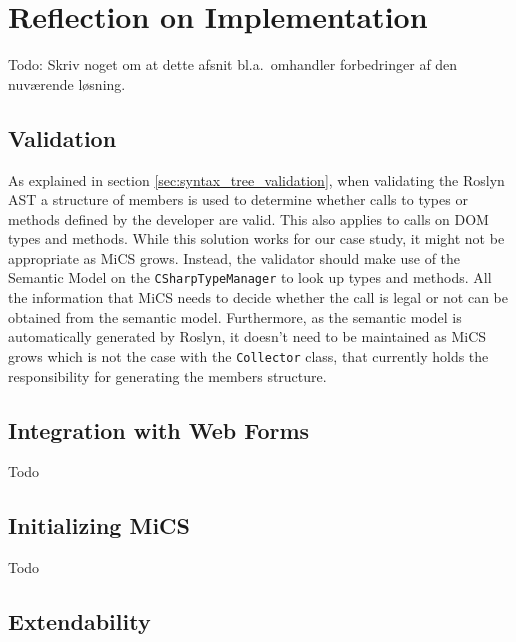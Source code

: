 \section{Reflection on Implementation} %
\label{sec:reflection_on_implementation}
Todo: Skriv noget om at dette afsnit bl.a.\ omhandler forbedringer af den nuværende løsning.

\subsection{Validation} %
\label{ssub:validation}

As explained in section \ref{sec:syntax_tree_validation}, when validating the Roslyn AST a structure of members is used to determine whether calls to types or methods defined by the developer are valid. This also applies to calls on DOM types and methods. While this solution works for our case study, it might not be appropriate as MiCS grows. Instead, the validator should make use of the Semantic Model on the \texttt{CSharpTypeManager} to look up types and methods. All the information that MiCS needs to decide whether the call is legal or not can be obtained from the semantic model. Furthermore, as the semantic model is automatically generated by Roslyn, it doesn't need to be maintained as MiCS grows which is not the case with the \texttt{Collector} class, that currently holds the responsibility for generating the members structure.

\subsection{Integration with Web Forms} %
\label{ssub:integration_with_web_forms}
Todo

\subsection{Initializing MiCS} %
\label{ssub:collecting_source_code}
Todo

\subsection{Extendability} %
\label{sub:extendability}


